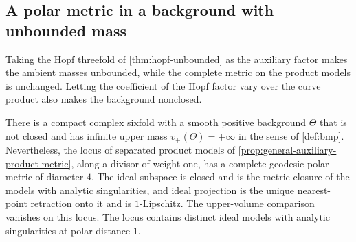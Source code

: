 \subsection{A polar metric in a background with unbounded mass}
\label{subsec:unbounded-auxiliary-polar-metric}

Taking the Hopf threefold of \cref{thm:hopf-unbounded} as the auxiliary factor makes the ambient masses unbounded, while the complete metric on the product models is unchanged. Letting the coefficient of the Hopf factor vary over the curve product also makes the background nonclosed.

\begin{example}\label{ex:unbounded-auxiliary-polar-metric}
There is a compact complex sixfold with a smooth positive background $\Theta$ that is not closed and has infinite upper mass $v_+(\Theta)=+\infty$ in the sense of \cref{def:bmp}. Nevertheless, the locus of separated product models of \cref{prop:general-auxiliary-product-metric}, along a divisor of weight one, has a complete geodesic polar metric of diameter $4$. The ideal subspace is closed and is the metric closure of the models with analytic singularities, and ideal projection is the unique nearest-point retraction onto it and is $1$-Lipschitz. The upper-volume comparison vanishes on this locus. The locus contains distinct ideal models with analytic singularities at polar distance $1$.
\end{example}
